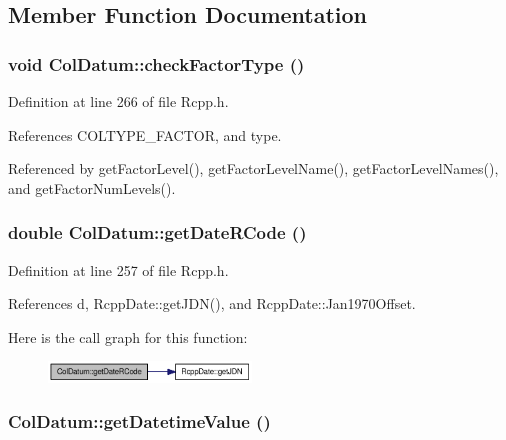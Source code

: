 \subsection{Member Function Documentation}
\hypertarget{classColDatum_9d151a64fb91608752346a9a16551410}{
\subsubsection[{checkFactorType}]{\setlength{\rightskip}{0pt plus 5cm}void ColDatum::checkFactorType ()}}
\label{classColDatum_9d151a64fb91608752346a9a16551410}




Definition at line 266 of file Rcpp.h.

References COLTYPE\_\-FACTOR, and type.

Referenced by getFactorLevel(), getFactorLevelName(), getFactorLevelNames(), and getFactorNumLevels().\hypertarget{classColDatum_87c424137afc43068bf1aba75035851d}{
\subsubsection[{getDateRCode}]{\setlength{\rightskip}{0pt plus 5cm}double ColDatum::getDateRCode ()}}
\label{classColDatum_87c424137afc43068bf1aba75035851d}




Definition at line 257 of file Rcpp.h.

References d, RcppDate::getJDN(), and RcppDate::Jan1970Offset.

Here is the call graph for this function:\nopagebreak
\begin{figure}[H]
\begin{center}
\leavevmode
\includegraphics[width=153pt]{classColDatum_87c424137afc43068bf1aba75035851d_cgraph}
\end{center}
\end{figure}
\hypertarget{classColDatum_408e78096b13b5047ae25e99e945ebf6}{
\subsubsection[{getDatetimeValue}]{ ColDatum::getDatetimeValue ()}}
\label{classColDatum_408e78096b13b5047ae25e99e945ebf6}




